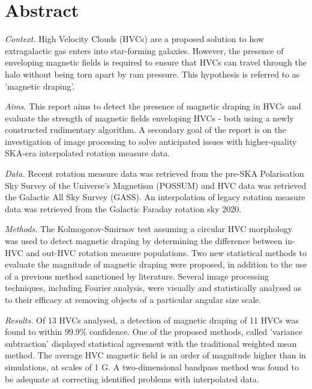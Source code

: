 \chapter*{Abstract}

\noindent\textit{Context.} High Velocity Clouds (HVCs) are a proposed solution to how extragalactic gas enters into star-forming galaxies. However, the presence of enveloping magnetic fields is required to ensure that HVCs can travel through the halo without being torn apart by ram pressure. This hypothesis is referred to as 'magnetic draping'.

\noindent\textit{Aims.} This report aims to detect the presence of magnetic draping in HVCs and evaluate the strength of magnetic fields enveloping HVCs - both using a newly constructed rudimentary algorithm. A secondary goal of the report is on the investigation of image processing to solve anticipated issues with higher-quality SKA-era interpolated rotation measure data.

\noindent\textit{Data.} Recent rotation measure data was retrieved from the pre-SKA Polarisation Sky Survey of the Universe's Magnetism (POSSUM) and HVC data was retrieved the Galactic All Sky Survey (GASS). An interpolation of legacy rotation measure data was retrieved from the Galactic Faraday rotation sky 2020.

\noindent\textit{Methods.} The Kolmogorov-Smirnov test assuming a circular HVC morphology was used to detect magnetic draping by determining the difference between in-HVC and out-HVC rotation measure populations. Two new statistical methods to evaluate the magnitude of magnetic draping were proposed, in addition to the use of a previous method sanctioned by literature. Several image processing techniques, including Fourier analysis, were visually and statistically analysed as to their efficacy at removing objects of a particular angular size scale.

\noindent\textit{Results.} Of 13 HVCs analysed, a detection of magnetic draping of 11 HVCs was found to within 99.9\% confidence. One of the proposed methods, called 'variance subtraction' displayed statistical agreement with the traditional weighted mean method. The average HVC magnetic field is an order of magnitude higher than in simulations, at scales of 1 \textmu G. A two-dimensional bandpass method was found to be adequate at correcting identified problems with interpolated data.


